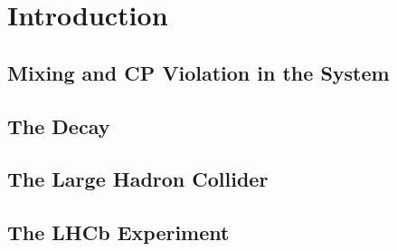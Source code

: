 \chapter{Introduction}


\section{Mixing and CP Violation in the \texorpdfstring{\BsBsbar{}}{Bs0-Bs0bar} System}
\label{sec:introMixing}
\section{The \texorpdfstring{\BstoJpsiphi{}}{Bs0->Jpsiphi} Decay}
\label{sec:introDecay}
\section{The Large Hadron Collider}
\section{The LHCb Experiment}

